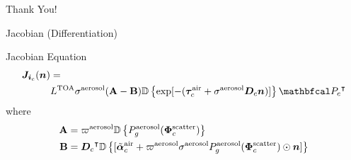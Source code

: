 \documentclass[compress,red,12pt]{beamer}
\begin{document}

\begin{frame}{}
\end{frame}


\begin{frame}{}
  \begin{center}
    {\huge Thank You!}
  \end{center}
\end{frame}


\appendix

\begin{frame}[label=jacobian]{Jacobian (Differentiation)}
  \begin{block}{Jacobian Equation}
    \begin{align*}
      {\bm J}_{{\bm i}_c}({\bm n}) &= \\
      &L^{\rm TOA}{\sigma}^{\rm
        aerosol}({\bf A}-{\bf B}) \OpDiag{\exp[-(\vect{\tau}_c^{\rm air} +
        {\sigma}^{\rm aerosol} {\bm D}_c {\bm n})]}
      \transpose{\OpCamera_c}
    \end{align*}
    where
    \begin{align*}
      {\bf A} &= \varpi^{\rm aerosol}
      \mathbb{D}\left\{ P_g^{\rm aerosol}(\bm{\Phi}^{\rm scatter}_c)\right\} \\
      {\bf B} &= {{\bm D}_c}^\intercal
      \mathbb{D}\left\{[\tilde{\bm{\alpha}}^{\rm air}_c + \varpi^{\rm
          aerosol}\sigma^{\rm aerosol} P^{\rm aerosol}_g(\bm{\Phi}^{\rm
          scatter}_c) \odot{\bm n}    ]\right\}
    \end{align*}
  \end{block}
  \hfill\hyperlink{gradient<2>}{}
\end{frame}

\end{document}
